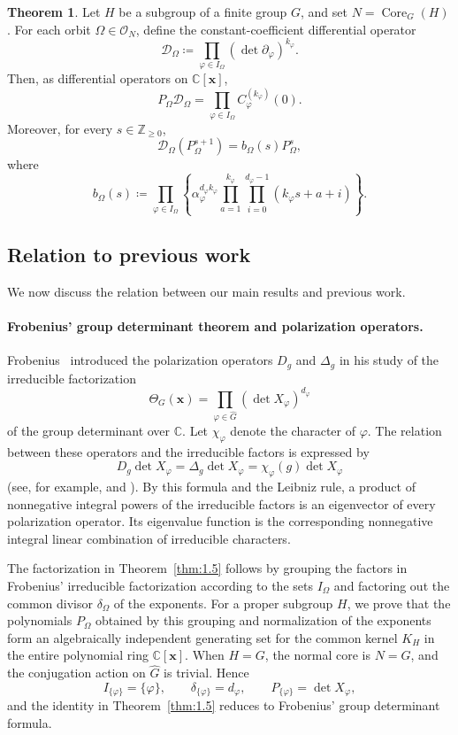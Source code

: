 \documentclass[12pt,a4paper]{article}
\theoremstyle{definition}
\newtheorem{thm}[definition]{Theorem}
\numberwithin{definition}{section}
\DeclareMathOperator{\Core}{Core}
\begin{document}
\begin{thm}\label{thm:1.9}
Let $H$ be a subgroup of a finite group $G$, and set $N=\Core_G(H)$.
For each orbit $\Omega\in\mathcal O_N$, define the constant-coefficient
differential operator
\[
\mathcal D_\Omega\coloneqq
\prod_{\varphi\in I_\Omega}(\det\partial_\varphi)^{k_\varphi}.
\]
Then, as differential operators on $\mathbb C[\bm x]$,
\[
P_\Omega\mathcal D_\Omega
=\prod_{\varphi\in I_\Omega}C_\varphi^{(k_\varphi)}(0).
\]
Moreover, for every $s\in\mathbb Z_{\ge0}$,
\[
\mathcal D_\Omega(P_\Omega^{s+1})=b_\Omega(s)P_\Omega^s,
\]
where
\[
b_\Omega(s)\coloneqq
\prod_{\varphi\in I_\Omega}
\left\{
\alpha_\varphi^{d_\varphi k_\varphi}
\prod_{a=1}^{k_\varphi}\prod_{i=0}^{d_\varphi-1}
(k_\varphi s+a+i)
\right\}.
\]
\end{thm}
\subsection*{Relation to previous work}
We now discuss the relation between our main results and previous work.

\paragraph{Frobenius' group determinant theorem and polarization operators.}
Frobenius~\cite{Frobenius1968gruppen} introduced the polarization operators
$D_g$ and $\Delta_g$ in his study of the irreducible factorization
\[
\Theta_G(\bm x)
=\prod_{\varphi\in\widehat G}(\det X_\varphi)^{d_\varphi}
\]
of the group determinant over $\mathbb C$.
Let $\chi_\varphi$ denote the character of $\varphi$.
The relation between these operators and the irreducible factors is expressed by
\[
D_g\det X_\varphi
=\Delta_g\det X_\varphi
=\chi_\varphi(g)\det X_\varphi
\]
(see, for example, \cite[p.~226]{MR803326} and
\cite[Sections~1 and~5]{Yamaguchi13022026}).
By this formula and the Leibniz rule, a product of nonnegative integral powers
of the irreducible factors is an eigenvector of every polarization operator.
Its eigenvalue function is the corresponding nonnegative integral linear
combination of irreducible characters.

The factorization in Theorem~\ref{thm:1.5} follows by grouping the factors
in Frobenius' irreducible factorization according to the sets $I_\Omega$
and factoring out the common divisor $\delta_\Omega$ of the exponents.
For a proper subgroup $H$, we prove that the polynomials $P_\Omega$ obtained
by this grouping and normalization of the exponents form an algebraically
independent generating set for the common kernel $K_H$ in the entire
polynomial ring $\mathbb C[\bm x]$.
When $H=G$, the normal core is $N=G$, and the conjugation action on
$\widehat G$ is trivial. Hence
\[
I_{\{\varphi\}}=\{\varphi\},\qquad
\delta_{\{\varphi\}}=d_\varphi,\qquad
P_{\{\varphi\}}=\det X_\varphi,
\]
and the identity in Theorem~\ref{thm:1.5} reduces to Frobenius'
group determinant formula.
\end{document}
